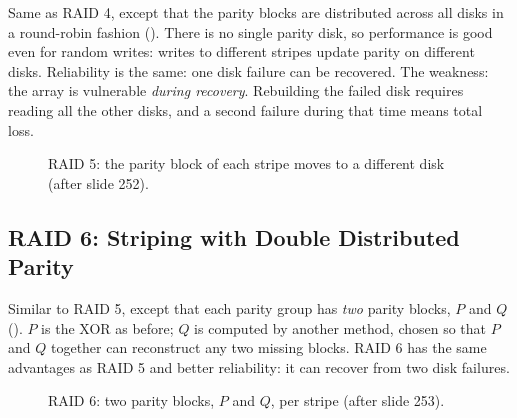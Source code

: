 Same as RAID 4, except that the parity blocks are distributed across all disks in a round-robin fashion (). There is no single parity disk, so performance is good even for random writes: writes to different stripes update parity on different disks. Reliability is the same: one disk failure can be recovered. The weakness: the array is vulnerable \emph{during recovery}. Rebuilding the failed disk requires reading all the other disks, and a second failure during that time means total loss.

\begin{figure}[H]
\centering
{}
\caption{RAID 5: the parity block of each stripe moves to a different disk (after slide 252).}
\label{fig:raid5}
\end{figure}

\subsection{RAID 6: Striping with Double Distributed Parity}

Similar to RAID 5, except that each parity group has \emph{two} parity blocks, $P$ and $Q$ (). $P$ is the XOR as before; $Q$ is computed by another method, chosen so that $P$ and $Q$ together can reconstruct any two missing blocks. RAID 6 has the same advantages as RAID 5 and better reliability: it can recover from two disk failures.

\begin{figure}[H]
\centering
{}
\caption{RAID 6: two parity blocks, $P$ and $Q$, per stripe (after slide 253).}
\label{fig:raid6}
\end{figure}

